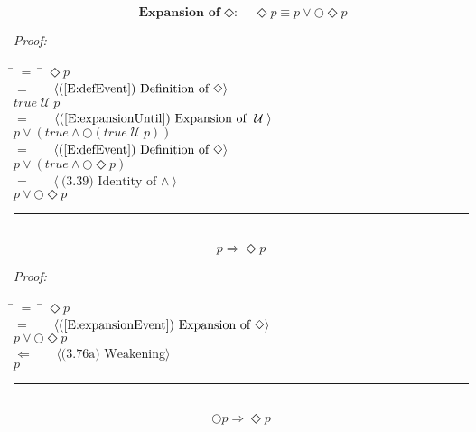 \documentclass[fleqn, leqno]{article}
\newcommand{\lgap}{2pt}                             %
\newcommand{\mymathindent}{24pt}                      %
\newcommand{\until}{\;\mathcal{U}\;}
\newcommand{\next}{\bigcirc}
\newcommand{\event}{\Diamond}
\newcommand{\myqed}{\hfill\rule[-.23ex]{1.2ex}{2.0ex}}
\newcommand{\Gll} {\langle}                         %
\newcommand{\Ggg} {\rangle}                         %
\newcommand{\Hint}[1]     {\ \ \ $\Gll              \mbox{#1} \Ggg$ }   %
\begin{document}
\begin{equation}\label{E:expansionEvent}
\textbf{Expansion of $\event$:}\quad \event p \equiv p \lor \next\event p
\end{equation}

\emph{Proof:}
\begin{tabbing}
\hspace{\mymathindent} \= $= \;$ \= \kill
  \> \>   $\event p$\\[\lgap]
  \> $=$  \>  \Hint{(\ref{E:defEvent}) Definition of $\event$}\\[\lgap]
  \> \>   $true \until p$\\[\lgap]
  \> $=$  \>  \Hint{(\ref{E:expansionUntil}) Expansion of $\until$}\\[\lgap]
  \> \>   $p \lor (true \land \next(true \until p))$\\[\lgap]
  \> $=$  \>  \Hint{(\ref{E:defEvent}) Definition of $\event$}\\[\lgap]
  \> \>   $p \lor (true \land \next\event p)$\\[\lgap]
  \> $=$  \>  \Hint{(3.39) Identity of $\land$}\\[\lgap]
  \> \>   $p \lor \next\event p$\\[\lgap]
\end{tabbing}
\myqed\\[\lgap]

\begin{equation}\label{E:impEvent}
p \Rightarrow \event p
\end{equation}

\emph{Proof:}
\begin{tabbing}
\hspace{\mymathindent} \= $= \;$ \= \kill
  \> \>   $\event p$\\[\lgap]
  \> $=$  \>  \Hint{(\ref{E:expansionEvent}) Expansion of $\event$}\\[\lgap]
  \> \>   $p \lor \next\event p$\\[\lgap]
  \> $\Leftarrow$  \>  \Hint{(3.76a) Weakening}\\[\lgap]
  \> \>   $p$\\[\lgap]
\end{tabbing}
\myqed\\[\lgap]


\begin{equation}\label{E:nextEvent}
\next p \Rightarrow \event p
\end{equation}
\end{document}
